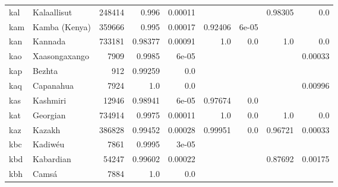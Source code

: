 \documentclass[11pt]{article}
\begin{document}
\begin{table*}[h]
{\begin{tabular}{llrrrrrrr}
kal         & Kalaallisut         & 248414         & 0.996         & 0.00011         &          &          & 0.98305         & 0.0         \\

kam         & Kamba (Kenya)         & 359666         & 0.995         & 0.00017         & 0.92406         & 6e-05         &          &          \\

kan         & Kannada         & 733181         & 0.98377         & 0.00091         & 1.0         & 0.0         & 1.0         & 0.0         \\

kao         & Xaasongaxango         & 7909         & 0.9985         & 6e-05         &          &          &          & 0.00033         \\

kap         & Bezhta         & 912         & 0.99259         & 0.0         &          &          &          &          \\

kaq         & Capanahua         & 7924         & 1.0         & 0.0         &          &          &          & 0.00996         \\

kas         & Kashmiri         & 12946         & 0.98941         & 6e-05         & 0.97674         & 0.0         &          &          \\

kat         & Georgian         & 734914         & 0.9975         & 0.00011         & 1.0         & 0.0         & 1.0         & 0.0         \\

kaz         & Kazakh         & 386828         & 0.99452         & 0.00028         & 0.99951         & 0.0         & 0.96721         & 0.00033         \\

kbc         & Kadiwéu         & 7861         & 0.9995         & 3e-05         &          &          &          &          \\

kbd         & Kabardian         & 54247         & 0.99602         & 0.00022         &          &          & 0.87692         & 0.00175         \\

kbh         & Camsá         & 7884         & 1.0         & 0.0         &          &          &          &          \\


\end{tabular}}
\end{table*}
\end{document}
